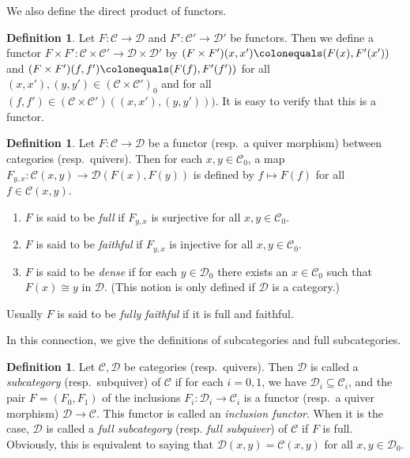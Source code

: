 \documentclass{surv-l}
\numberwithin{equation}{chapter}
\numberwithin{figure}{chapter}
\theoremstyle{plain}
\theoremstyle{definition}
\newtheorem{dfn}[thm]{Definition}
\theoremstyle{remark}
\begin{document}
We also define the direct product of functors.

\begin{dfn}\label{dfn:product-fun}
Let $F\colon {\mathcal{C}} \to {\mathcal{D}}$ and $F' \colon {\mathcal{C}}' \to {\mathcal{D}}'$ be functors.
Then we define a functor $F \times F' \colon {\mathcal{C}} \times {\mathcal{C}}' \to {\mathcal{D}} \times {\mathcal{D}}'$ by
$(F \times F')(x, x')\colonequals  (F(x), F'(x'))$ and $(F\times F')(f, f')\colonequals  (F(f), F'(f'))$
for all $(x, x'), (y,y')  \in ({\mathcal{C}} \times {\mathcal{C}}')_0$ and for all
$(f, f') \in ({\mathcal{C}} \times {\mathcal{C}}')((x, x'), (y, y')))$.
It is easy to verify that this is a functor.
\end{dfn}

\begin{dfn}
Let $F \colon {\mathcal{C}} \to {\mathcal{D}}$ be a functor (resp.\ a quiver morphism)
between categories (resp.\ quivers).
Then for each $x, y \in {\mathcal{C}}_0$, a map
$F_{y,x} \colon {\mathcal{C}}(x, y) \to {\mathcal{D}}(F(x), F(y))$ is defined by $f \mapsto F(f)$
for all $f \in {\mathcal{C}}(x, y)$.
\begin{enumerate}
\item
$F$ is said to be \emph{full} if $F_{y,x}$ is surjective for all $x, y \in {\mathcal{C}}_0$.
\item
$F$ is said to be \emph{faithful} if $F_{y,x}$ is injective for all $x, y \in {\mathcal{C}}_0$.
\item
$F$ is said to be \emph{dense} if
for each $y \in {\mathcal{D}}_0$ there exists an $x \in {\mathcal{C}}_0$ such that
$F(x) \cong y$ in ${\mathcal{D}}$.
(This notion is only defined if ${\mathcal{D}}$ is a category.)
\end{enumerate}
Usually $F$ is said to be \emph{fully faithful} if it is full and faithful.
\end{dfn}

In this connection, we give the definitions of subcategories and full subcategories.

\begin{dfn}\label{dfn:subcat}
Let ${\mathcal{C}}, {\mathcal{D}}$ be categories (resp.\ quivers).
Then ${\mathcal{D}}$ is called a \emph{subcategory} (resp.\ subquiver) of ${\mathcal{C}}$
if for each $i = 0, 1$, we have ${\mathcal{D}}_i \subseteq {\mathcal{C}}_i$, and
the pair $F = (F_0, F_1)$ of
the inclusions $F_i \colon {\mathcal{D}}_i \to {\mathcal{C}}_i$ is a functor
(resp.\ a quiver morphism) ${\mathcal{D}} \to {\mathcal{C}}$.
This functor is called an \emph{inclusion functor}.
When it is the case, ${\mathcal{D}}$ is called a \emph{full subcategory} (resp. \emph{full subquiver})
of ${\mathcal{C}}$ if $F$ is full.
Obviously, this is equivalent to saying that
${\mathcal{D}}(x, y) = {\mathcal{C}}(x, y)$ for all $x, y \in {\mathcal{D}}_0$.
\end{dfn}
\end{document}
